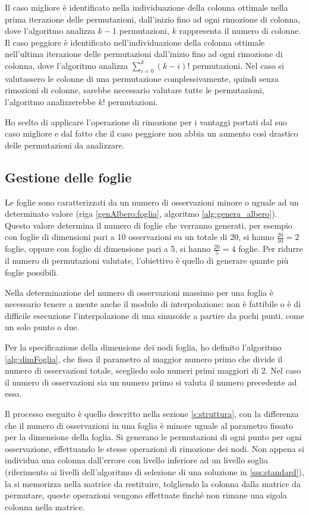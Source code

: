 \documentclass[a4paper,12pt]{report}
\begin{document}
    Il caso migliore è identificato nella individuazione della colonna ottimale nella prima iterazione delle permutazioni, dall'inizio fino ad ogni rimozione di colonna, dove l'algoritmo analizza $k-1$ permutazioni, $k$ rappresenta il numero di colonne. Il caso peggiore è identificato nell'individuazione della colonna ottimale nell'ultima iterazione delle permutazioni dall'inizio fino ad ogni rimozione di colonna, dove l'algoritmo analizza  $\sum_{i=0}^k (k-i)!$ permutazioni.
    Nel caso si valutassero le colonne di una permutazione complessivamente, quindi senza rimozioni di colonne, sarebbe necessario valutare tutte le permutazioni, l'algoritmo analizzerebbe $k!$ permutazioni.

    Ho scelto di applicare l'operazione di rimozione per i vantaggi portati dal suo caso migliore e dal fatto che il caso peggiore non abbia un aumento così drastico delle permutazioni da analizzare.


  \subsection{Gestione delle foglie}
  Le foglie sono caratterizzati da un numero di osservazioni minore o uguale ad un determinato valore (riga \ref{genAlbero:foglia}, algoritmo \ref{alg:genera_albero}). Questo valore determina il numero di foglie che verranno generati, per esempio con foglie di dimensioni pari a 10 osservazioni su un totale di 20, si hanno $\frac{20}{10} = 2$ foglie, oppure con foglie di dimensione pari a 5, si hanno $\frac{20}{5} = 4$ foglie. Per ridurre il numero di permutazioni valutate, l'obiettivo è quello di generare quante più foglie possibili.

  Nella determinazione del numero di osservazioni massimo per una foglia è necessario tenere a mente anche il modulo di interpolazione: non è fattibile o è di difficile esecuzione l'interpolazione di una sinusoide a partire da pochi punti, come un solo punto o due.

  Per la specificazione della dimensione dei nodi foglia, ho definito l'algoritmo \ref{alg:dimFoglia}, che fissa il parametro al maggior numero primo che divide il numero di osservazioni totale, scegliedo solo numeri primi maggiori di 2. Nel caso il numero di osservazioni sia un numero primo si valuta il numero precedente ad esso.

  Il processo eseguito è quello descritto nella sezione \ref{s:struttura}, con la differenza che il numero di osservazioni in una foglia è minore uguale al parametro fissato per la dimensione della foglia.
  Si generano le permutazioni di ogni punto per ogni osservazione, effettuando le stesse operazioni di rimozione dei nodi. Non appena si individua una colonna dall'errore con livello inferiore ad un livello soglia (riferimento ai livelli dell'algoritmo di selezione di una soluzione in \ref{sss:standard}), la si memorizza nella matrice da restituire, tolgliendo la colonna dalla matrice da permutare, queste operazioni vengono effettuate finché non rimane una sigola colonna nella matrice.
\end{document}
